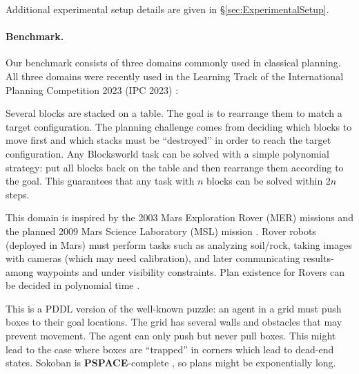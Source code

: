 \documentclass{article}
\renewcommand{\cite}[1]{\citep[][]{#1}}
\newcommand{\pspace}{\textbf{\textup{PSPACE}}}
\begin{document}
Additional experimental setup details are given in \S\ref{sec:ExperimentalSetup}.



\paragraph{Benchmark.}

Our benchmark consists of three domains commonly used in classical planning. All
three domains were recently used in the Learning Track of the International
Planning Competition 2023 (IPC 2023) \citep{taitler-et-al-aimag2024}:

\begin{description}[font=\normalfont\itshape]
\item[Blocksworld:]

Several blocks are stacked on a table. The goal is to rearrange them to match a
target configuration. The planning challenge comes from deciding which blocks to
move first and which stacks must be ``destroyed'' in order to reach the target
configuration. Any Blocksworld task can be solved with a simple polynomial
strategy: put all blocks back on the table and then rearrange them according to
the goal. This guarantees that any task with $n$ blocks can be solved within
$2n$ steps.

\item[Rovers:]

This domain is inspired by the 2003 Mars Exploration Rover (MER) missions and
the planned 2009 Mars Science Laboratory (MSL) mission
\cite{long-fox-jair2003}. Rover robots (deployed in Mars) must perform tasks
such as analyzing soil/rock, taking images with cameras (which may need
calibration), and later communicating results-among waypoints and under
visibility constraints. Plan existence for Rovers can be decided in polynomial time \cite{helmert-icaps2006}.

\item[Sokoban:]

This is a PDDL version of the well-known puzzle: an agent in a grid must push
boxes to their goal locations. The grid has several walls and obstacles that may
prevent movement. The agent can only push but never pull boxes. This might lead
to the case where boxes are ``trapped'' in corners which lead to dead-end
states. Sokoban is \pspace-complete \citep{culberson-tr1997}, so plans might be
exponentially long.
\end{description}
\end{document}
